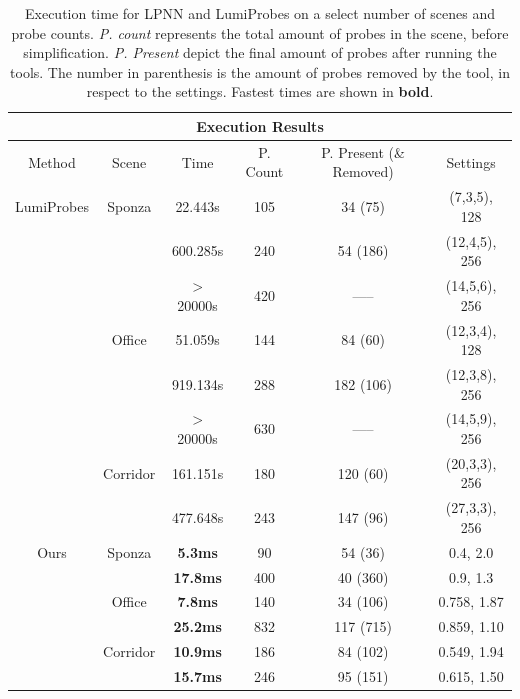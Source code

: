 \begin{table}
	\centering
\begin{tabular}{ |c||c|c|c|c|c|  }
	\hline
	\multicolumn{6}{|c|}{Execution Results} \\
	\hline
	Method & Scene & Time & P. Count & P. Present (\& Removed) & Settings\\
	\hline
	LumiProbes & Sponza   & 22.443s  & 105 & 34 (75)  & (7,3,5), 128 \\
			   &          & 600.285s & 240 & 54 (186) & (12,4,5), 256 \\
			   &          & $>$20000s & 420 & -----   & (14,5,6), 256 \\
	\cline{2-6}
	           & Office   & 51.059s  & 144 & 84 (60)  & (12,3,4), 128\\
	           &          & 919.134s & 288 & 182 (106)& (12,3,8), 256\\
	           &          & $>$20000s & 630 & -----   & (14,5,9), 256\\
	\cline{2-6}
	           & Corridor & 161.151s & 180 & 120 (60) & (20,3,3), 256\\
	           &          & 477.648s & 243 & 147 (96) & (27,3,3), 256\\
	\hline
	\hline
	Ours       & Sponza   & \textbf{5.3ms}  & 90  & 54 (36)   & 0.4, 2.0 \\
			   &          & \textbf{17.8ms} & 400 & 40 (360)  & 0.9, 1.3 \\
	\cline{2-6}
			   & Office   & \textbf{7.8ms}  & 140 & 34 (106)  & 0.758, 1.87 \\
               &          & \textbf{25.2ms} & 832 & 117 (715) & 0.859, 1.10 \\
    \cline{2-6}
    		   & Corridor & \textbf{10.9ms} & 186 & 84 (102)  & 0.549, 1.94 \\
               &          & \textbf{15.7ms} & 246 & 95 (151)  & 0.615, 1.50 \\
               
	\hline
\end{tabular}
\caption{Execution time for LPNN and LumiProbes on a select number of scenes and probe counts. \textit{P. count} represents the total amount of probes in the scene, before simplification. \textit{P. Present} depict the final amount of probes after running the tools. The number in parenthesis is the amount of probes removed by the tool, in respect to the settings. Fastest times are shown in \textbf{bold}.}
\label{table:times}
\end{table}

